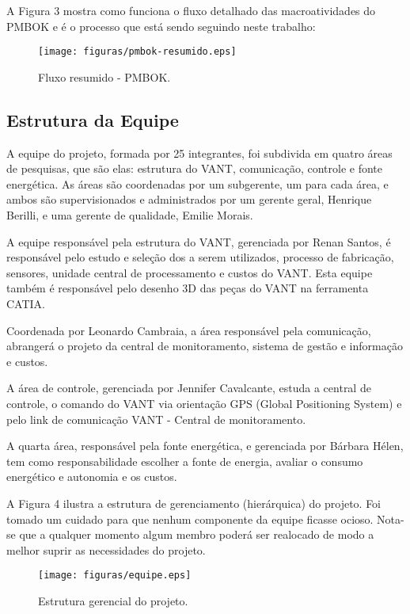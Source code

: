 A Figura 3 mostra como funciona o fluxo detalhado das macroatividades do PMBOK e é o processo que está sendo seguindo neste trabalho:

\begin{figure}[ht]
	\centering
		\texttt{[image: figuras/pmbok-resumido.eps]}
	\caption{Fluxo resumido - PMBOK.}
\end{figure}

\subsection{Estrutura da Equipe}
A equipe do projeto, formada por 25 integrantes, foi subdivida em quatro áreas de pesquisas, que são elas: estrutura do VANT, comunicação, controle e fonte energética. As áreas são coordenadas por um subgerente, um para cada área, e ambos são supervisionados e administrados por um gerente geral, Henrique Berilli, e uma gerente de qualidade, Emilie Morais.

A equipe responsável pela estrutura do VANT, gerenciada por Renan Santos, é responsável pelo estudo e seleção dos a serem utilizados, processo de fabricação, sensores, unidade central de processamento e custos do VANT. Esta equipe também é responsável pelo desenho 3D das peças do VANT na ferramenta CATIA.  
	
Coordenada por Leonardo Cambraia, a área responsável pela comunicação, abrangerá o projeto da central de monitoramento, sistema de gestão e informação e custos.
	
A área de controle, gerenciada por Jennifer Cavalcante, estuda a central de controle, o comando do VANT via orientação GPS (Global Positioning System) e pelo link de comunicação VANT - Central de monitoramento.
	
A quarta área, responsável pela fonte energética, e gerenciada por Bárbara Hélen, tem como responsabilidade escolher a fonte de energia, avaliar o consumo energético e autonomia e os custos.
	
A Figura 4 ilustra a estrutura de gerenciamento (hierárquica) do projeto. Foi tomado um cuidado para que nenhum componente da equipe ficasse ocioso. Nota-se que a qualquer momento algum membro poderá ser realocado de modo a melhor suprir as necessidades do projeto.

\begin{figure}[ht]
	\centering
		\texttt{[image: figuras/equipe.eps]}
	\caption{Estrutura gerencial do projeto.}
\end{figure}

